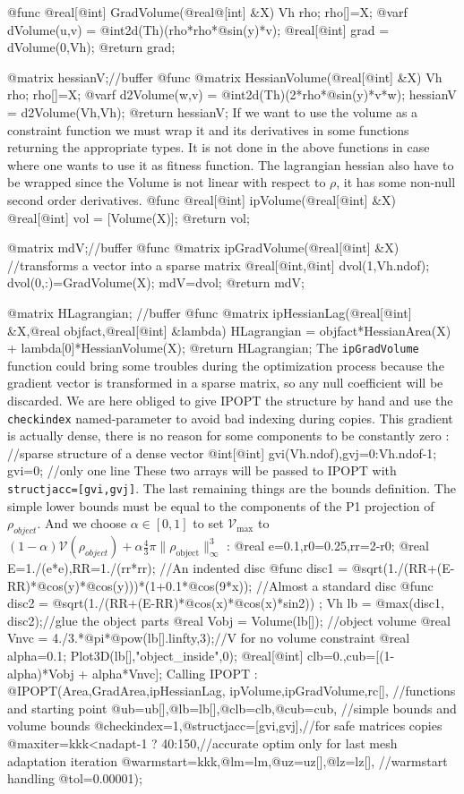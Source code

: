 \documentclass[a4paper,twoside,12pt]{book}
\begin{document}
{@func @real[@int] GradVolume(@real@[int] &X)
{
  Vh rho;
  rho[]=X;
  @varf dVolume(u,v) = @int2d(Th)(rho*rho*@sin(y)*v);
  @real[@int] grad = dVolume(0,Vh);
  @return grad;
}

@matrix hessianV;//buffer
@func @matrix HessianVolume(@real[@int] &X)
{
  Vh rho;
  rho[]=X;
  @varf d2Volume(w,v) = @int2d(Th)(2*rho*@sin(y)*v*w);
  hessianV = d2Volume(Vh,Vh);
  @return hessianV;
}
\eFF
If we want to use the volume as a constraint function
we must wrap it and its derivatives in some \freefempp functions returning the appropriate types.
It is not done in the above functions in case where one wants to use it as fitness function.
The lagrangian hessian also have to be wrapped since the Volume is not linear with 
respect to $\rho$, it has some non-null second order derivatives.
\bFF
@func @real[@int] ipVolume(@real[@int] &X) {@real[@int] vol = [Volume(X)]; @return vol;}

@matrix mdV;//buffer
@func @matrix ipGradVolume(@real[@int] &X) 
{//transforms a vector into a sparse matrix
  @real[@int,@int] dvol(1,Vh.ndof);
  dvol(0,:)=GradVolume(X); 
  mdV=dvol; 
  @return mdV;
}

@matrix HLagrangian; //buffer
@func @matrix ipHessianLag(@real[@int] &X,@real objfact,@real[@int] &lambda)
{
  HLagrangian = objfact*HessianArea(X) + lambda[0]*HessianVolume(X);
  @return HLagrangian;
}
\eFF
The {\tt ipGradVolume} function could bring some troubles during the optimization process because the gradient vector is transformed in a sparse matrix, so any null coefficient
will be discarded. We are here obliged to give IPOPT the structure by hand and use the {\tt checkindex} named-parameter to avoid bad indexing during copies. 
This gradient is actually dense, there is no reason for some components to be constantly zero :
\bFF
//sparse structure of a dense vector
@int[@int] gvi(Vh.ndof),gvj=0:Vh.ndof-1;
gvi=0; //only one line
\eFF
These two arrays will be passed to IPOPT with {\tt structjacc=[gvi,gvj]}. The last remaining things are the bounds definition. The simple lower bounds 
must be equal to the components of the P1 projection of $\rho_{object}$. And we choose $\alpha\in [0,1]$ to set $\mathcal{V}_{\mathrm{max}}$ to 
$(1-\alpha) \mathcal{V}(\rho_{object}) + \alpha\frac{4}{3}\pi \|\rho_{\mathrm{object}}\|_{\infty}^{3}$ :
\bFF
@real e=0.1,r0=0.25,rr=2-r0;
@real E=1./(e*e),RR=1./(rr*rr);
//An indented disc
@func disc1 = @sqrt(1./(RR+(E-RR)*@cos(y)*@cos(y)))*(1+0.1*@cos(9*x));
//Almost a standard disc
@func disc2 = @sqrt(1./(RR+(E-RR)*@cos(x)*@cos(x)*sin2))  ;
Vh lb =  @max(disc1, disc2);//glue the object parts
@real Vobj = Volume(lb[]); //object volume
@real Vnvc = 4./3.*@pi*@pow(lb[].linfty,3);//V for no volume constraint
@real alpha=0.1;
Plot3D(lb[],"object_inside",0);
@real[@int] clb=0.,cub=[(1-alpha)*Vobj + alpha*Vnvc];
\eFF
Calling IPOPT :
\bFF
@IPOPT(Area,GradArea,ipHessianLag,
      ipVolume,ipGradVolume,rc[], //functions and starting point
      @ub=ub[],@lb=lb[],@clb=clb,@cub=cub, //simple bounds and volume bounds
      @checkindex=1,@structjacc=[gvi,gvj],//for safe matrices copies
      @maxiter=kkk<nadapt-1 ? 40:150,//accurate optim only for last mesh adaptation iteration
      @warmstart=kkk,@lm=lm,@uz=uz[],@lz=lz[], //warmstart handling
      @tol=0.00001);

}
\end{document}
